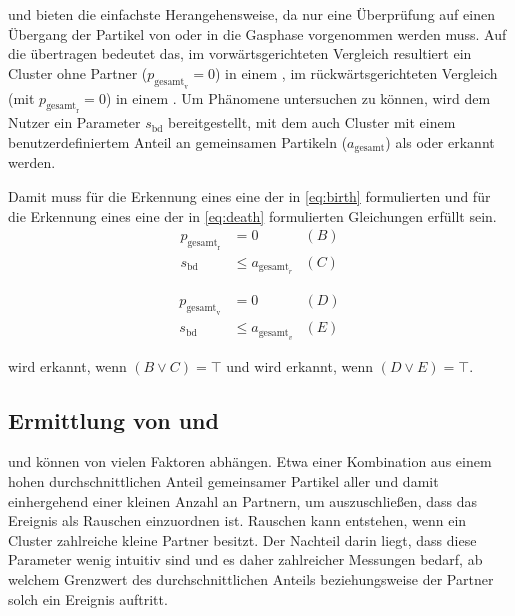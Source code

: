  und  bieten die einfachste Herangehensweise, da nur eine Überprüfung auf einen Übergang der Partikel von oder in die Gasphase vorgenommen werden muss. Auf die  übertragen bedeutet das, im vorwärtsgerichteten Vergleich resultiert ein Cluster ohne Partner ($p_{\text{gesamt}_\text{v}} = 0$) in einem , im rückwärtsgerichteten Vergleich (mit $p_{\text{gesamt}_\text{r}} = 0$) in einem . Um Phänomene untersuchen zu können, wird dem Nutzer ein Parameter $s_\text{bd}$ bereitgestellt, mit dem auch Cluster mit einem benutzerdefiniertem Anteil an gemeinsamen Partikeln ($a_\text{gesamt}$) als  oder  erkannt werden.

Damit muss für die Erkennung eines  eine der in \autoref{eq:birth} formulierten und für die Erkennung eines  eine der in  \autoref{eq:death} formulierten Gleichungen erfüllt sein.
\begin{equation}
	\begin{aligned}\label{eq:birth}
		p_{\text{gesamt}_\text{r}} &= 0 &(B)\\
		s_\text{bd} &\le a_{\text{gesamt}_r} &(C)
	\end{aligned}
\end{equation}

\begin{equation}
	\begin{aligned}\label{eq:death}
		p_{\text{gesamt}_\text{v}} &= 0 &(D)\\
		s_\text{bd} &\le a_{\text{gesamt}_v} &(E)
\end{aligned}
\end{equation}

 wird erkannt, wenn $(B \lor C) = \top$ und  wird erkannt, wenn $(D \lor E) = \top$.

\subsection*{Ermittlung von  und }
 und  können von vielen Faktoren abhängen. Etwa einer Kombination aus einem hohen durchschnittlichen Anteil gemeinsamer Partikel aller  und damit einhergehend einer kleinen Anzahl an Partnern, um auszuschließen, dass das Ereignis als Rauschen einzuordnen ist. Rauschen kann entstehen, wenn ein Cluster zahlreiche kleine Partner besitzt.
Der Nachteil darin liegt, dass diese Parameter wenig intuitiv sind und es daher zahlreicher Messungen bedarf, ab welchem Grenzwert des durchschnittlichen Anteils beziehungsweise der Partner solch ein Ereignis auftritt.

